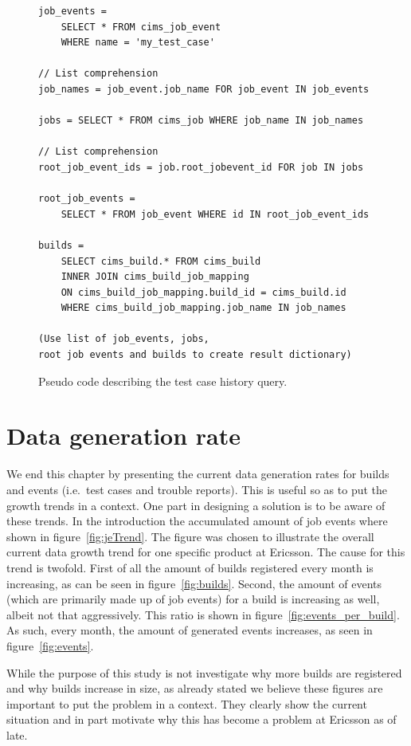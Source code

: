 \begin{figure}[ht]
\begin{mdframed}
\begin{verbatim}
job_events = 
    SELECT * FROM cims_job_event 
    WHERE name = 'my_test_case'

// List comprehension
job_names = job_event.job_name FOR job_event IN job_events 

jobs = SELECT * FROM cims_job WHERE job_name IN job_names

// List comprehension
root_job_event_ids = job.root_jobevent_id FOR job IN jobs

root_job_events = 
    SELECT * FROM job_event WHERE id IN root_job_event_ids

builds = 
    SELECT cims_build.* FROM cims_build
    INNER JOIN cims_build_job_mapping
    ON cims_build_job_mapping.build_id = cims_build.id
    WHERE cims_build_job_mapping.job_name IN job_names

(Use list of job_events, jobs, 
root job events and builds to create result dictionary)
\end{verbatim}
\end{mdframed}
\caption{Pseudo code describing the test case history query.}
\label{code:tc_history}
\end{figure}

\section{Data generation rate}
\label{datagenrate}
We end this chapter by presenting the current data generation rates for builds and events (i.e.\ test cases and trouble reports). This is useful so as to put the growth trends in a context. One part in designing a solution is to be aware of these trends. In the introduction the accumulated amount of job events where shown in figure~\ref{fig:jeTrend}. The figure was chosen to illustrate the overall current data growth trend for one specific product at Ericsson. The cause for this trend is twofold. First of all the amount of builds registered every month is increasing, as can be seen in figure~\ref{fig:builds}. Second, the amount of events (which are primarily made up of job events) for a build is increasing as well, albeit not that aggressively. This ratio is shown in figure~\ref{fig:events_per_build}. As such, every month, the amount of generated events increases, as seen in figure~\ref{fig:events}.

While the purpose of this study is not investigate why more builds are registered and why builds increase in size, as already stated we believe these figures are important to put the problem in a context. They clearly show the current situation and in part motivate why this has become a problem at Ericsson as of late.

